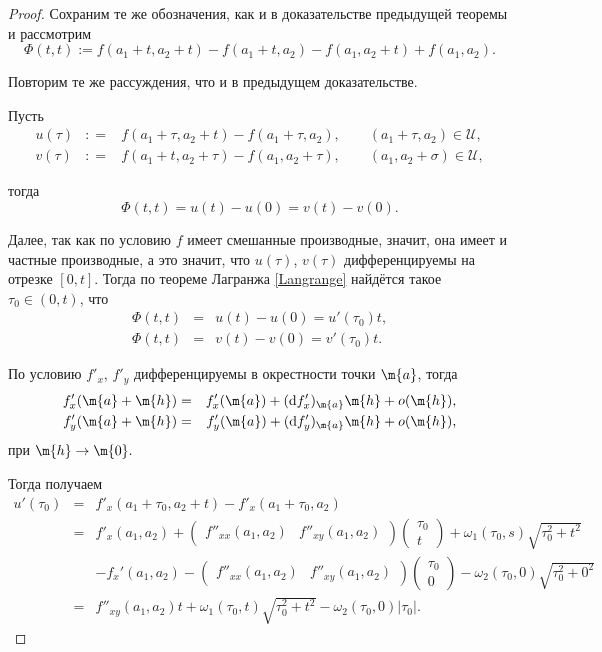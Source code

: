 \begin{proof}
    Сохраним те же обозначения, как и в доказательстве предыдущей теоремы и рассмотрим 
        \[
     \Phi(t,t):= f(a_1+t, a_2 +t) -f(a_1+t,a_2) - f(a_1,a_2+t) +f(a_1,a_2).
    \]

Повторим те же рассуждения, что и в предыдущем доказательстве. 

Пусть 
\begin{eqnarray*}
 u(\tau) &: =& f(a_1 + \tau, a_2 + t) - f(a_1+ \tau, a_2), \qquad (a_1 + \tau, a_2) \in \mathscr{U} ,\\
 v(\tau) &: =& f(a_1 + t, a_2 + \tau) - f(a_1, a_2+\tau), \qquad (a_1, a_2+\sigma) \in \mathscr{U} ,
\end{eqnarray*}

тогда
\[
 \Phi(t,t) = u(t) - u(0) = v(t) - v(0).
\]

Далее, так как по условию $f$ имеет смешанные производные, значит, она имеет и частные производные, а это значит, что $u(\tau)$, $v(\tau)$  дифференцируемы на отрезке $[0,t]$. Тогда по теореме Лагранжа \ref{Langrange} найдётся такое $\tau_0 \in (0, t)$, что
\begin{eqnarray*}
    \Phi(t,t) &=& u(t) - u(0) = u'(\tau_0)t,\\
    \Phi(t,t) &=& v(t) - v(0) = v'(\tau_0)t.
\end{eqnarray*}

По условию $f'_x$, $f'_y$ дифференцируемы в окрестности точки $\m{a}$, тогда
\begin{eqnarray*}
    f'_x(\m{a} + \m{h}) &=& f'_x(\m{a}) + (\mathrm{d}f_x')_\m{a} \m{h} + o(\m{h}), \\
    f'_y(\m{a} + \m{h}) &=& f'_y(\m{a}) + (\mathrm{d}f_y')_\m{a} \m{h} + o(\m{h}),
\end{eqnarray*}
при $\m{h} \to \m{0}.$

Тогда получаем
\begin{eqnarray*}
    u'(\tau_0) &=& f'_x(a_1 + \tau_0, a_2 + t) - f'_x(a_1+ \tau_0, a_2) \\
    &=& f'_x(a_1,a_2) + \begin{pmatrix}
        f''_{xx}(a_1,a_2) & f''_{xy}(a_1,a_2) 
    \end{pmatrix} \begin{pmatrix}
        \tau_0 \\ t
    \end{pmatrix} + \omega_1(\tau_0, s) \sqrt{\tau_0^2 +t^2} \\
    && - f_x'(a_1,a_2) - \begin{pmatrix}
        f''_{xx}(a_1,a_2) & f''_{xy}(a_1,a_2) 
    \end{pmatrix} \begin{pmatrix}
        \tau_0 \\ 0
    \end{pmatrix} - \omega_2(\tau_0, 0) \sqrt{\tau_0^2 +0^2} \\
    &=& f''_{xy}(a_1,a_2) t + \omega_1(\tau_0, t) \sqrt{\tau_0^2 +t^2}- \omega_2(\tau_0, 0) |\tau_0|.
\end{eqnarray*}


\end{proof}

